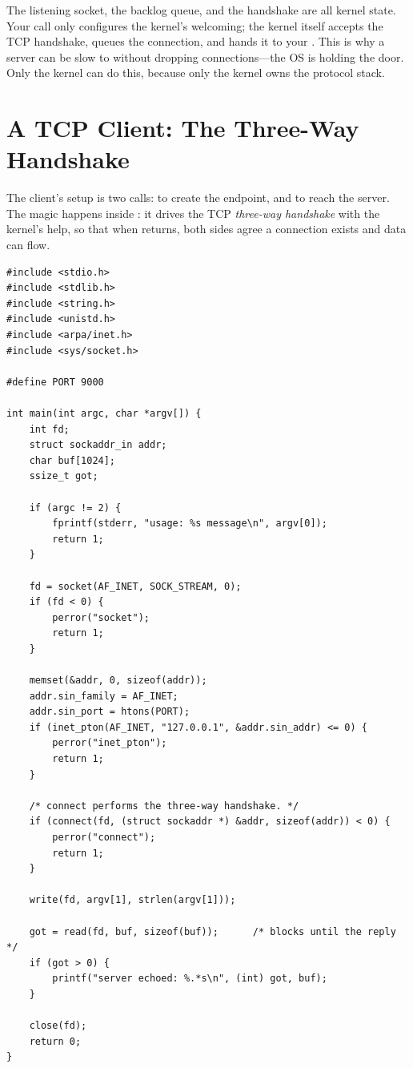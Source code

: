 \begin{osconcept}
The listening socket, the backlog queue, and the handshake are all
kernel state. Your  call only configures the kernel's
welcoming; the kernel itself accepts the TCP handshake, queues the
connection, and hands it to your . This is why a server
can be slow to  without dropping connections---the OS is
holding the door. Only the kernel can do this, because only the kernel
owns the protocol stack.
\end{osconcept}

\section{A TCP Client: The Three-Way Handshake}

The client's setup is two calls:  to create the endpoint,
and  to reach the server. The magic happens inside
: it drives the TCP \emph{three-way handshake} with the
kernel's help, so that when  returns, both sides agree a
connection exists and data can flow.

\begin{lstlisting}[caption={tcp\_client.c: send a message, print the reply.}]
#include <stdio.h>
#include <stdlib.h>
#include <string.h>
#include <unistd.h>
#include <arpa/inet.h>
#include <sys/socket.h>

#define PORT 9000

int main(int argc, char *argv[]) {
    int fd;
    struct sockaddr_in addr;
    char buf[1024];
    ssize_t got;

    if (argc != 2) {
        fprintf(stderr, "usage: %s message\n", argv[0]);
        return 1;
    }

    fd = socket(AF_INET, SOCK_STREAM, 0);
    if (fd < 0) {
        perror("socket");
        return 1;
    }

    memset(&addr, 0, sizeof(addr));
    addr.sin_family = AF_INET;
    addr.sin_port = htons(PORT);
    if (inet_pton(AF_INET, "127.0.0.1", &addr.sin_addr) <= 0) {
        perror("inet_pton");
        return 1;
    }

    /* connect performs the three-way handshake. */
    if (connect(fd, (struct sockaddr *) &addr, sizeof(addr)) < 0) {
        perror("connect");
        return 1;
    }

    write(fd, argv[1], strlen(argv[1]));

    got = read(fd, buf, sizeof(buf));      /* blocks until the reply */
    if (got > 0) {
        printf("server echoed: %.*s\n", (int) got, buf);
    }

    close(fd);
    return 0;
}
\end{lstlisting}

